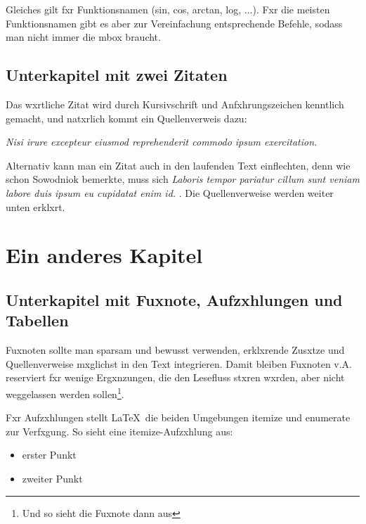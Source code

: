             Gleiches gilt fxr Funktionsnamen (sin, cos, arctan, log, ...). Fxr die meisten Funktionsnamen gibt es aber zur Vereinfachung entsprechende Befehle, sodass man nicht immer die mbox braucht.


        \section{Unterkapitel mit zwei Zitaten}

            Das wxrtliche Zitat wird durch Kursivschrift und Anfxhrungszeichen kenntlich gemacht, und natxrlich kommt ein Quellenverweis dazu:

            \medskip
            \emph{Nisi irure excepteur eiusmod reprehenderit commodo ipsum exercitation.} \cite{sowodniok}
            \medskip

            Alternativ kann man ein Zitat auch in den laufenden Text einflechten, denn wie schon Sowodniok bemerkte, muss sich 
            \emph{Laboris tempor pariatur cillum sunt veniam labore duis ipsum eu cupidatat enim id.} \citep[111]{sowodniok}. 
            Die Quellenverweise werden weiter unten erklxrt.


    \chapter{Ein anderes Kapitel}
                
        \section{Unterkapitel mit Fuxnote, Aufzxhlungen und Tabellen}\label{sec_fussnot}
                
            Fuxnoten sollte man sparsam und bewusst verwenden, erklxrende Zusxtze und Quellenverweise mxglichst in den Text integrieren. Damit bleiben Fuxnoten v.A. reserviert fxr wenige Ergxnzungen, die den Lesefluss stxren wxrden, aber nicht weggelassen werden sollen\footnote{Und so sieht die Fuxnote dann aus}.

            Fxr Aufzxhlungen stellt \LaTeX\ die beiden Umgebungen itemize und enumerate zur Verfxgung. So sieht eine itemize-Aufzxhlung aus:

            \begin{itemize}\setlength{\itemsep}{0ex} %
                \item erster Punkt
                \item zweiter Punkt
            \end{itemize}


